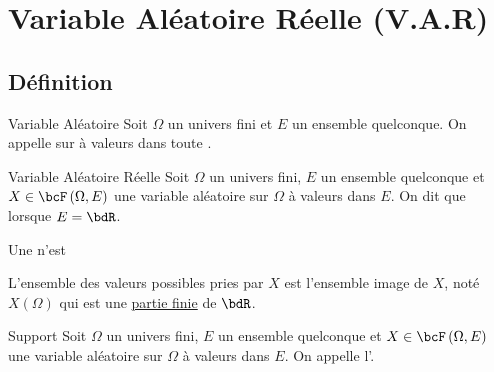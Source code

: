 \documentclass[a4paper,french,bookmarks]{article}
\begin{document}

    \initcours{}

    \section{Variable Aléatoire Réelle (V.A.R)}

    \subsection{Définition}

    \begin{definition}{Variable Aléatoire}{}
        Soit $\Omega$ un univers fini et $E$ un ensemble quelconque.
        On appelle  sur \hg{$\Omega$} à valeurs
        dans  toute .
    \end{definition}

    \begin{definition}{Variable Aléatoire Réelle}{}
        Soit $\Omega$ un univers fini, $E$ un ensemble quelconque et $X
        \in \bcF\left(\Omega, E\right)$ une variable aléatoire sur $\Omega$
        à valeurs dans $E$. On dit que  lorsque $E = \bdR$.
    \end{definition}

    \begin{warning}{}{}
        Une  n'est
        \begin{enumerate}
            \ithand {}
            \ithand {}
        \end{enumerate}
    \end{warning}

    L'ensemble des valeurs possibles pries par $X$ est l'ensemble image
    de $X$, noté $X\left(\Omega\right)$ qui est une \underline{partie
    finie} de $\bdR$.

    \begin{definition}{Support}{}
        Soit $\Omega$ un univers fini, $E$ un ensemble quelconque
        et $X \in \bcF\left(\Omega, E\right)$ une variable aléatoire sur
        $\Omega$ à valeurs dans $E$. On appelle  l'.
    \end{definition}
\end{document}
